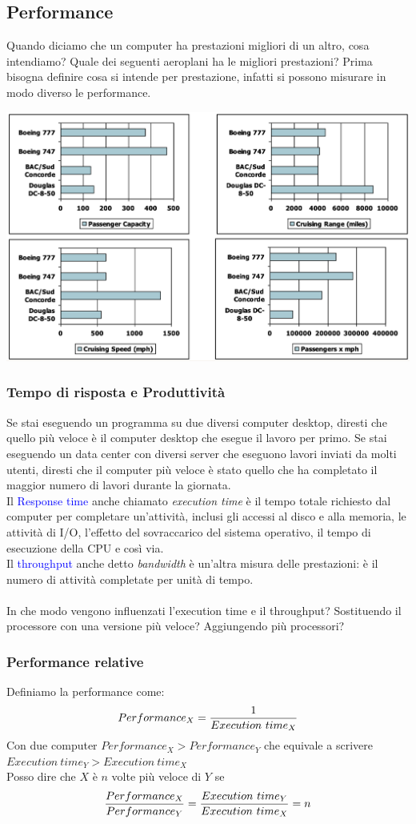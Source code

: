 \documentclass[12pt,a4paper]{article}
\begin{document}
\subsection{Performance}
Quando diciamo che un computer ha prestazioni migliori di un altro, cosa intendiamo?
Quale dei seguenti aeroplani ha le migliori prestazioni?
Prima bisogna definire cosa si intende per prestazione, infatti si possono misurare in modo diverso le performance.
\begin{center}
\includegraphics[width=0.7\columnwidth]{img/performance_plane.png}
\end{center}
\subsubsection{Tempo di risposta e Produttività}
Se stai eseguendo un programma su due diversi computer desktop, diresti che quello più veloce è il computer desktop che esegue il lavoro per primo. Se stai eseguendo un data center con diversi server che eseguono lavori inviati da molti utenti, diresti che il computer più veloce è stato quello che ha completato il maggior numero di lavori durante la giornata.\\
Il \textcolor{blue}{Response time} anche chiamato \textsl{execution time} è il tempo totale richiesto dal computer per completare un'attività, inclusi gli accessi al disco e alla memoria, le attività di I/O, l'effetto del sovraccarico del sistema operativo, il tempo di esecuzione della CPU e così via.\\
Il \textcolor{blue}{throughput} anche detto \textsl{bandwidth} è un'altra misura delle prestazioni: è il numero di attività completate per unità di tempo.\\
\\
In che modo vengono influenzati l'execution time e il throughput? Sostituendo il processore con una versione più veloce? Aggiungendo più processori?

\subsubsection{Performance relative}
Definiamo la performance come: $$Performance_X = {1 \over Execution\ time_X}$$
Con due computer $Performance_X > Performance_Y$ che equivale a scrivere $ Execution\ time_Y > Execution\ time_X$\\
Posso dire che $X$ è $n$ volte più veloce di $Y$ se $${Performance_X \over Performance_Y} = {Execution\ time_Y \over Execution\ time_X} = n$$
\end{document}
